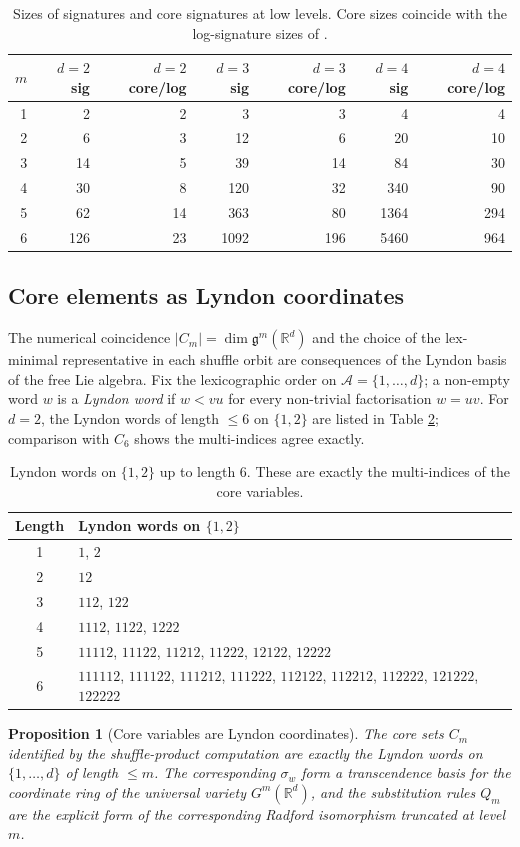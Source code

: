 \documentclass[11pt,english]{article}
\providecommand{\tabularnewline}{\\}
\newtheorem{proposition}[theorem]{Proposition}
\begin{document}
\begin{table}[H]
\centering
\begin{tabular}{|r|r|r|r|r|r|r|}
\hline
$m$ & $d=2$ sig & $d=2$ core/log & $d=3$ sig & $d=3$ core/log & $d=4$ sig & $d=4$ core/log\tabularnewline
\hline\hline
1 & 2 & 2 & 3 & 3 & 4 & 4\tabularnewline\hline
2 & 6 & 3 & 12 & 6 & 20 & 10\tabularnewline\hline
3 & 14 & 5 & 39 & 14 & 84 & 30\tabularnewline\hline
4 & 30 & 8 & 120 & 32 & 340 & 90\tabularnewline\hline
5 & 62 & 14 & 363 & 80 & 1364 & 294\tabularnewline\hline
6 & 126 & 23 & 1092 & 196 & 5460 & 964\tabularnewline\hline
\end{tabular}
\caption{Sizes of signatures and core signatures at low levels. Core sizes
coincide with the log-signature sizes of \cite{log signatures}.\label{tab:Sizes}}
\end{table}

\subsection{Core elements as Lyndon coordinates}

The numerical coincidence $|C_{m}|=\dim\mathfrak{g}^{m}(\mathbb{R}^{d})$
and the choice of the lex-minimal representative in each shuffle orbit
are consequences of the Lyndon basis of the free Lie algebra. Fix
the lexicographic order on $\mathcal{A}=\{1,\ldots,d\}$; a non-empty
word $w$ is a \emph{Lyndon word} if $w<vu$ for every non-trivial
factorisation $w=uv$. For $d=2$, the Lyndon words of length $\leq6$
on $\{1,2\}$ are listed in Table \ref{tab:Lyndon-d2}; comparison
with $C_{6}$ shows the multi-indices agree exactly.

\begin{table}[H]
\centering
\begin{tabular}{|c|l|}
\hline
Length & Lyndon words on $\{1,2\}$\tabularnewline
\hline\hline
1 & $1$, $2$\tabularnewline\hline
2 & $12$\tabularnewline\hline
3 & $112$, $122$\tabularnewline\hline
4 & $1112$, $1122$, $1222$\tabularnewline\hline
5 & $11112$, $11122$, $11212$, $11222$, $12122$, $12222$\tabularnewline\hline
6 & $111112$, $111122$, $111212$, $111222$, $112122$, $112212$, $112222$, $121222$, $122222$\tabularnewline\hline
\end{tabular}
\caption{Lyndon words on $\{1,2\}$ up to length 6. These are exactly the multi-indices
of the core variables.\label{tab:Lyndon-d2}}
\end{table}

\begin{proposition}[Core variables are Lyndon coordinates]
\label{prop:core-is-lyndon} The core sets $C_{m}$ identified by
the shuffle-product computation are exactly the Lyndon words on $\{1,\ldots,d\}$
of length $\leq m$. The corresponding $\sigma_{w}$ form a transcendence
basis for the coordinate ring of the universal variety $G^{m}(\mathbb{R}^{d})$,
and the substitution rules $Q_{m}$ are the explicit form of the corresponding
Radford isomorphism truncated at level $m$.
\end{proposition}
\end{document}
